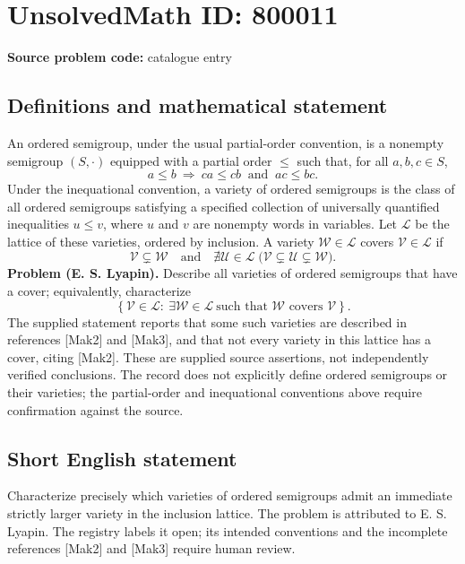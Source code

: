 \documentclass[11pt]{article}
\begin{document}
\section*{UnsolvedMath ID: 800011}
\textbf{Source problem code:} catalogue entry
\subsection{Definitions and mathematical statement}
An ordered semigroup, under the usual partial-order convention, is a nonempty semigroup \((S,\cdot)\) equipped with a partial order \(\leq\) such that, for all \(a,b,c\in S\),
\[
a\leq b\ \Longrightarrow\ ca\leq cb\ \text{ and }\ ac\leq bc.
\]
Under the inequational convention, a variety of ordered semigroups is the class of all ordered semigroups satisfying a specified collection of universally quantified inequalities \(u\leq v\), where \(u\) and \(v\) are nonempty words in variables. Let \(\mathcal L\) be the lattice of these varieties, ordered by inclusion. A variety \(\mathcal W\in\mathcal L\) covers \(\mathcal V\in\mathcal L\) if
\[
\mathcal V\subsetneq\mathcal W
\quad\text{and}\quad
\nexists\mathcal U\in\mathcal L\;\bigl(\mathcal V\subsetneq\mathcal U\subsetneq\mathcal W\bigr).
\]
\textbf{Problem (E. S. Lyapin).} Describe all varieties of ordered semigroups that have a cover; equivalently, characterize
\[
\left\{\mathcal V\in\mathcal L:\ \exists\mathcal W\in\mathcal L\ \text{such that }\mathcal W\text{ covers }\mathcal V\right\}.
\]
The supplied statement reports that some such varieties are described in references [Mak2] and [Mak3], and that not every variety in this lattice has a cover, citing [Mak2]. These are supplied source assertions, not independently verified conclusions. The record does not explicitly define ordered semigroups or their varieties; the partial-order and inequational conventions above require confirmation against the source.
\subsection{Short English statement}
Characterize precisely which varieties of ordered semigroups admit an immediate strictly larger variety in the inclusion lattice. The problem is attributed to E. S. Lyapin. The registry labels it open; its intended conventions and the incomplete references [Mak2] and [Mak3] require human review.
\end{document}

